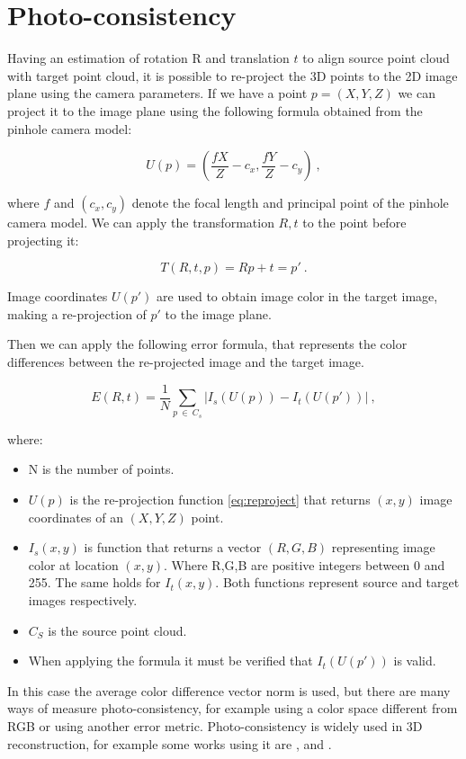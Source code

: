\section{Photo-consistency}
\label{sec:photocons}

Having an estimation of rotation R and translation $t$ to align source point cloud with target point cloud, 
it is possible to re-project the 3D points to the 2D image plane using the 
camera parameters. If we have a point $p=(X,Y,Z)$ we can project it to the image plane using the following formula obtained 
from the pinhole camera model:

\begin{equation}
U(p) = (\frac{fX}{Z} - c_x, \frac{fY}{Z} - c_y) \ ,
\label{eq:reproject}
\end{equation}

\noindent where $f$ and $(c_x,c_y)$ denote the focal length and principal point of the pinhole camera model. 
We can apply the transformation $R,t$ to the point before projecting it:

\begin{equation}
T(R,t,p) = Rp + t = p' \ .
\end{equation}

\noindent Image coordinates  $U(p')$ are used to obtain image color in the target image, making a re-projection of $p'$ to the image plane.

Then we can apply the following error formula, that represents the color differences between the re-projected image and 
the target image. 

\begin{equation}
E(R,t) = \frac{1}{N} \sum\limits_{p\ \in\ C_s} |I_s(U(p)) - I_t(U(p'))| \ ,
\end{equation}


\noindent where:
\begin{itemize}
\item N is the number of points.
\item $U(p)$ is the re-projection function \ref{eq:reproject} that returns $(x,y)$ image coordinates of an $(X,Y,Z)$ point.
\item  $I_s(x,y)$ is function that returns a vector $(R,G,B)$ representing image color at location $(x,y)$. Where 
R,G,B are positive integers between 0 and 255. The same holds for $I_t(x,y)$. Both functions represent 
source and target images respectively.
\item $C_S$ is the source point cloud.
\item When applying the formula it must be verified that $I_t(U(p'))$ is valid.
\end{itemize}

In this case the average color difference vector norm is used, but there are many ways of measure photo-consistency, 
for example using a color space different from RGB or using another error metric. Photo-consistency is widely used in 3D reconstruction, for example some works using it are \cite{Whelan13},\cite{kerl13icra} and \cite{Newcombe10livedense}.


